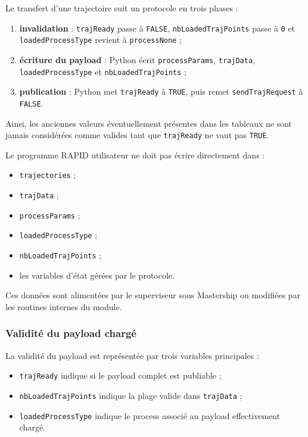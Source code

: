 \documentclass{rapportENSAM}
\begin{document}
Le transfert d'une trajectoire suit un protocole en trois phases :

\begin{enumerate}
    \item \textbf{invalidation} :
    \texttt{trajReady} passe à \texttt{FALSE},
    \texttt{nbLoadedTrajPoints} passe à \texttt{0} et
    \texttt{loadedProcessType} revient à \texttt{processNone} ;
    \item \textbf{écriture du payload} :
    Python écrit \texttt{processParams}, \texttt{trajData},
    \texttt{loadedProcessType} et \texttt{nbLoadedTrajPoints} ;
    \item \textbf{publication} :
    Python met \texttt{trajReady} à \texttt{TRUE}, puis remet
    \texttt{sendTrajRequest} à \texttt{FALSE}.
\end{enumerate}

Ainsi, les anciennes valeurs éventuellement présentes dans les tableaux ne
sont jamais considérées comme valides tant que \texttt{trajReady} ne vaut pas
\texttt{TRUE}.

Le programme RAPID utilisateur ne doit pas écrire directement dans :

\begin{itemize}
    \item \texttt{trajectories} ;
    \item \texttt{trajData} ;
    \item \texttt{processParams} ;
    \item \texttt{loadedProcessType} ;
    \item \texttt{nbLoadedTrajPoints} ;
    \item les variables d'état gérées par le protocole.
\end{itemize}

Ces données sont alimentées par le superviseur sous Mastership ou modifiées par
les routines internes du module.


\subsubsection{Validité du payload chargé}
\label{subsubsec:rapid-loaded-payload-validity}

La validité du payload est représentée par trois variables principales :

\begin{itemize}
    \item \texttt{trajReady} indique si le payload complet est publiable ;
    \item \texttt{nbLoadedTrajPoints} indique la plage valide dans
    \texttt{trajData} ;
    \item \texttt{loadedProcessType} indique le process associé au payload
    effectivement chargé.
\end{itemize}
\end{document}
